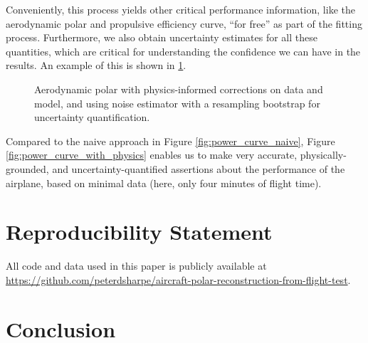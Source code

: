 \documentclass[conf]{new-aiaa}
\begin{document}
    Conveniently, this process yields other critical performance information, like the aerodynamic polar and propulsive efficiency curve, ``for free'' as part of the fitting process. Furthermore, we also obtain uncertainty estimates for all these quantities, which are critical for understanding the confidence we can have in the results. An example of this is shown in \ref{fig:aerodynamic_polar_with_physics}.

    \begin{figure}[!htb]
        \centering
        \caption{Aerodynamic polar with physics-informed corrections on data and model, and using noise estimator with a resampling bootstrap for uncertainty quantification.}
        \label{fig:aerodynamic_polar_with_physics}
    \end{figure}

    Compared to the naive approach in Figure \ref{fig:power_curve_naive}, Figure \ref{fig:power_curve_with_physics} enables us to make very accurate, physically-grounded, and uncertainty-quantified assertions about the performance of the airplane, based on minimal data (here, only four minutes of flight time).


    \section{Reproducibility Statement}

    All code and data used in this paper is publicly available at \url{https://github.com/peterdsharpe/aircraft-polar-reconstruction-from-flight-test}.


    \section{Conclusion}
    \label{sec:conclusion}
\end{document}
